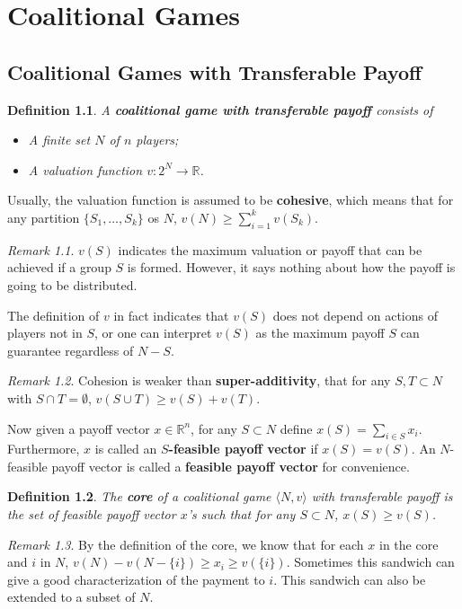 \documentclass[openany]{book}
\newtheorem{definition}{Definition}[chapter]
\theoremstyle{remark}
\newtheorem*{remark}{Remark}
\begin{document}
\chapter{Coalitional Games}\label{chp:coalGame}
\section{Coalitional Games with Transferable Payoff}
\begin{definition}
    A \textbf{coalitional game with transferable payoff} consists of
    \begin{itemize}
        \item A finite set $N$ of $n$ players;
        \item A valuation function $v:2^N\to \mathbb{R}$.
    \end{itemize}
\end{definition}
Usually, the valuation function is assumed to be \textbf{cohesive}, which means that for any partition $\{S_1,\ldots,S_k\}$ os $N$, $v(N)\ge \sum_{i=1}^{k}v(S_k)$.
\begin{remark}
    $v(S)$ indicates the maximum valuation or payoff that can be achieved if a group $S$ is formed. However, it says nothing about how the payoff is going to be distributed.

    The definition of $v$ in fact indicates that $v(S)$ does not depend on actions of players not in $S$, or one can interpret $v(S)$ as the maximum payoff $S$ can guarantee regardless of $N-S$.
\end{remark}
\begin{remark}
    Cohesion is weaker than \textbf{super-additivity}, that for any $S,T\subset N$ with $S\cap T=\emptyset$, $v(S\cup T)\ge v(S)+v(T)$.
\end{remark}

Now given a payoff vector $x\in \mathbb{R}^n$, for any $S\subset N$ define $x(S)=\sum_{i\in S}^{}x_i$. Furthermore, $x$ is called an $S$\textbf{-feasible payoff vector} if $x(S)=v(S)$. An $N$-feasible payoff vector is called a \textbf{feasible payoff vector} for convenience.

\begin{definition}\label{coreTU}
    The \textbf{core} of a coalitional game $\langle N,v\rangle$ with transferable payoff is the set of feasible payoff vector $x$'s such that for any $S\subset N$, $x(S)\ge v(S)$.
\end{definition}
\begin{remark}
    By the definition of the core, we know that for each $x$ in the core and $i$ in $N$, $v(N)-v(N-\{i\})\ge x_i\ge v(\{i\})$. Sometimes this sandwich can give a good characterization of the payment to $i$. This sandwich can also be extended to a subset of $N$.
\end{remark}
\end{document}
